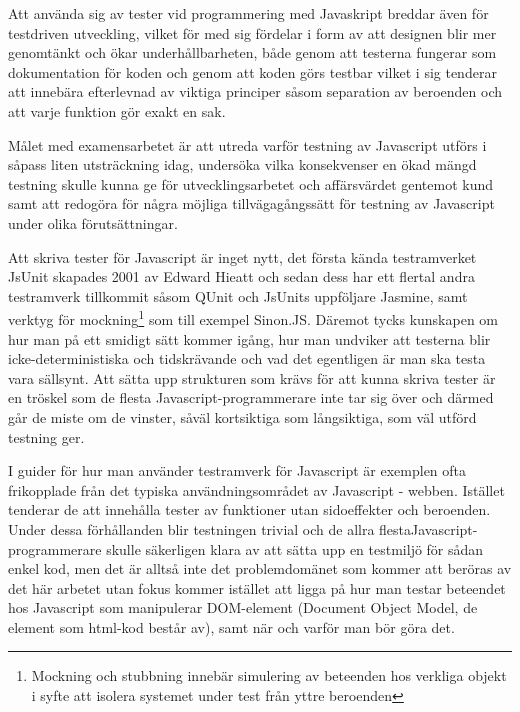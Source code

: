 \documentclass[11pt]{article}
\begin{document}
Att använda sig av tester vid programmering med Javaskript breddar även för testdriven utveckling, vilket för med sig fördelar i form av att designen blir mer genomtänkt och ökar underhållbarheten, både genom att testerna fungerar som dokumentation för koden och genom att koden görs testbar vilket i sig tenderar att innebära efterlevnad av viktiga principer såsom separation av beroenden och att varje funktion gör exakt en sak.

Målet med examensarbetet är att utreda varför testning av Javascript utförs i såpass liten utsträckning idag, undersöka vilka konsekvenser en ökad mängd testning skulle kunna ge för utvecklingsarbetet och affärsvärdet gentemot kund samt att redogöra för några möjliga tillvägagångssätt för testning av Javascript under olika förutsättningar.

Att skriva tester för Javascript är inget nytt, det första kända testramverket JsUnit skapades 2001 av Edward Hieatt\cite{GoingFaster}\cite{JsUnitGithub} och sedan dess har ett flertal andra testramverk tillkommit såsom QUnit\cite{QUnitSite} och JsUnits uppföljare Jasmine\cite{JasmineSite}, samt verktyg för mockning\footnote{Mockning och stubbning innebär simulering av beteenden hos verkliga objekt i syfte att isolera systemet under test från yttre beroenden} som till exempel Sinon.JS\cite{SinonJS}. Däremot tycks kunskapen om hur man på ett smidigt sätt kommer igång, hur man undviker att testerna blir icke-deterministiska och tidskrävande och vad det egentligen är man ska testa vara sällsynt. Att sätta upp strukturen som krävs för att kunna skriva tester är en tröskel som de flesta Javascript-programmerare inte tar sig över och därmed går de miste om de vinster, såväl kortsiktiga som långsiktiga, som väl utförd testning ger.

I guider för hur man använder testramverk för Javascript är exemplen ofta frikopplade från det typiska användningsområdet av Javascript - webben. Istället tenderar de att innehålla tester av funktioner utan sidoeffekter och beroenden. Under dessa förhållanden blir testningen trivial och de allra flestaJavascript-programmerare skulle säkerligen klara av att sätta upp en testmiljö för sådan enkel kod, men det är alltså inte det problemdomänet som kommer att beröras av det här arbetet utan fokus kommer istället att ligga på hur man testar beteendet hos Javascript som manipulerar DOM-element (Document Object Model, de element som html-kod består av), samt när och varför man bör göra det.
\end{document}
